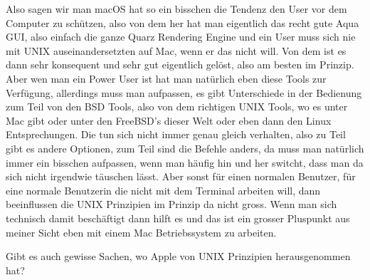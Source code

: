 \begin{description}
\NH Also sagen wir man macOS hat so ein bisschen die Tendenz den User vor dem Computer zu schützen, also von dem her hat man eigentlich das recht gute Aqua GUI, also einfach die ganze Quarz Rendering Engine und ein User muss sich nie mit UNIX auseinandersetzten auf Mac, wenn er das nicht will. Von dem ist es dann sehr konsequent und sehr gut eigentlich gelöst, also am besten im Prinzip. Aber wen man ein Power User ist hat man natürlich eben diese Tools zur Verfügung, allerdings muss man aufpassen, es gibt Unterschiede in der Bedienung zum Teil von den BSD Tools, also von dem richtigen UNIX Tools, wo es unter Mac gibt oder unter den FreeBSD's dieser Welt oder eben dann den Linux Entsprechungen. Die tun sich nicht immer genau gleich verhalten, also zu Teil gibt es andere Optionen, zum Teil sind die Befehle anders, da muss man natürlich immer ein bisschen aufpassen, wenn man häufig hin und her switcht, dass man da sich nicht irgendwie täuschen lässt. Aber sonst für einen normalen Benutzer, für eine normale Benutzerin die nicht mit dem Terminal arbeiten will, dann beeinflussen die UNIX Prinzipien im Prinzip da nicht gross. Wenn man sich technisch damit beschäftigt dann hilft es und das ist ein grosser Pluspunkt aus meiner Sicht eben mit einem Mac Betriebssystem zu arbeiten.

\DS Gibt es auch gewisse Sachen, wo Apple von UNIX Prinzipien herausgenommen hat?


\end{description}
